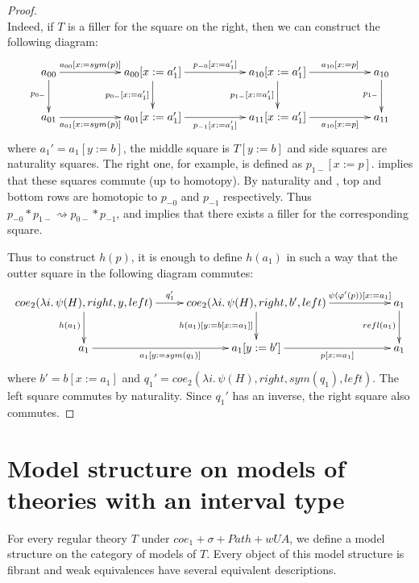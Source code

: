 \documentclass[reqno]{amsart}
\theoremstyle{definition}
\theoremstyle{remark}
\newcommand{\repl}{:=}
\newcommand{\idtype}{\rightsquigarrow}
\numberwithin{figure}{section}
\begin{document}
\begin{proof}
\[{            } \]
Indeed, if $T$ is a filler for the square on the right, then we can construct the following diagram:
\[ \xymatrix{ a_{00} \ar[rr]^-{a_{00}[x \repl sym(p)]} \ar[d]_{p_{0-}} & & a_{00}[x \repl a_1'] \ar[rr]^{p_{-0}[x \repl a_1']} \ar[d]_{p_{0-}[x \repl a_1']} & & a_{10}[x \repl a_1'] \ar[d]_{p_{1-}[x \repl a_1']} \ar[rr]^-{a_{10}[x \repl p]} & & a_{10} \ar[d]_{p_{1-}} \\
              a_{01} \ar[rr]_-{a_{01}[x \repl sym(p)]}                 & & a_{01}[x \repl a_1'] \ar[rr]_{p_{-1}[x \repl a_1']}                               & & a_{11}[x \repl a_1']                               \ar[rr]_-{a_{10}[x \repl p]} & & a_{11}
            } \]
where $a_1' = a_1[y \repl b]$, the middle square is $T[y \repl b]$ and side squares are naturality squares.
The right one, for example, is defined as $p_{1-}[x \repl p]$.
 implies that these squares commute (up to homotopy).
By naturality and , top and bottom rows are homotopic to $p_{-0}$ and $p_{-1}$ respectively.
Thus $p_{-0} * p_{1-} \idtype p_{0-} * p_{-1}$, and  implies that there exists a filler for the corresponding square.

Thus to construct $h(p)$, it is enough to define $h(a_1)$ in such a way that the outter square in the following diagram commutes:
\[ \xymatrix{ coe_2(\lambda i.\,\psi(H), right, y, left) \ar[r]^{q_1'} \ar[d]_{h(a_1)} & coe_2(\lambda i.\,\psi(H), right, b', left) \ar[rr]^-{\psi(\varphi'(p))[x \repl a_1]} \ar[d]_{h(a_1)[y \repl b[x \repl a_1]]} & & a_1 \ar[d]_{refl(a_1)} \\
              a_1 \ar[r]_{a_1[y \repl sym(q_1)]} & a_1[y \repl b'] \ar[rr]_-{p[x \repl a_1]}                                                                                                                           & & a_1
            } \]
where $b' = b[x \repl a_1]$ and $q_1' = coe_2(\lambda i.\,\psi(H), right, sym(q_1), left)$.
The left square commutes by naturality.
Since $q_1'$ has an inverse, the right square also commutes.
\end{proof}

\section{Model structure on models of theories with an interval type}

For every regular theory $T$ under $coe_1 + \sigma + Path + wUA$, we define a model structure on the category of models of $T$.
Every object of this model structure is fibrant and weak equivalences have several equivalent descriptions.
\end{document}
